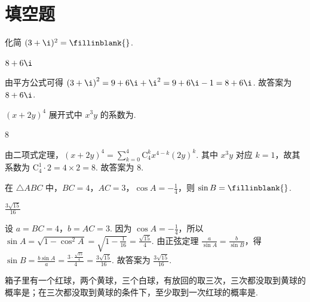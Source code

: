 \section{填空题}

\begin{problem}
化简 \((3+\i)^2=\fillinblank{}\).
\end{problem}

\begin{answer}
\(8+6\i\)
\end{answer}

\begin{solution}
由平方公式可得 \(\left( 3+\i \right)^2=9+6\i+\i^2=9+6\i-1=8+6\i\). 故答案为 \(8+6\i\).
\end{solution}

\begin{problem}
\((x+2y)^4\) 展开式中 \(x^3y\) 的系数为\fillinblank{}.
\end{problem}

\begin{answer}
\(8\)
\end{answer}

\begin{solution}
由二项式定理，\(\left( x+2y \right)^4=\sum_{k=0}^4 \mathrm C_4^k x^{4-k}\left( 2y \right)^k\). 其中 \(x^3y\) 对应 \(k=1\)，故其系数为 \(\mathrm C_4^1\cdot 2=4\times 2=8\). 故答案为 \(8\).
\end{solution}

\begin{problem}
在 \(\triangle ABC\) 中，\(BC=4\)，\(AC=3\)，\(\cos A=-\frac{1}{4}\)，则 \(\sin B=\fillinblank{}\).
\end{problem}

\begin{answer}
\(\frac{3\sqrt{15}}{16}\)
\end{answer}

\begin{solution}
设 \(a=BC=4\)，\(b=AC=3\). 因为 \(\cos A=-\frac{1}{4}\)，所以 \(\sin A=\sqrt{1-\cos^2 A}=\sqrt{1-\frac{1}{16}}=\frac{\sqrt{15}}{4}\).
由正弦定理 \(\frac{a}{\sin A}=\frac{b}{\sin B}\)，得 \(\sin B=\frac{b\sin A}{a}=\frac{3\cdot \frac{\sqrt{15}}{4}}{4}=\frac{3\sqrt{15}}{16}\).
故答案为 \(\frac{3\sqrt{15}}{16}\).
\end{solution}

\begin{problem}
箱子里有一个红球，两个黄球，三个白球，有放回的取三次，三次都没取到黄球的概率是\fillinblank{}；在三次都没取到黄球的条件下，至少取到一次红球的概率是\fillinblank{}.
\end{problem}


